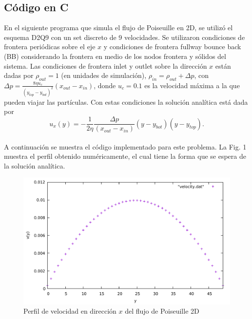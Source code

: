 \documentclass{article}
\begin{document}
\subsection{Código en C}
En el siguiente programa que simula el flujo de Poiseuille en 2D, se utilizó el esquema D2Q9 con un set discreto de 9 velocidades. Se utilizaron condiciones de frontera periódicas sobre el eje $x$ y condiciones de frontera fullway bounce back (BB) considerando la frontera en medio de los nodos frontera y sólidos del sistema. Las condiciones de frontera inlet y outlet sobre la dirección $x$ están dadas por $\rho_{out} = 1$ (en unidades de simulación), $\rho_{in}= \rho_{out} + \Delta p$, con $\Delta p=\frac{8\eta u_c}{(y_{top}-y_{bot})^2} (x_{out} - x_{in})$, donde $u_c=0.1$ es la velocidad máxima a la que pueden viajar las partículas. Con estas condiciones la solución analítica está dada por
\begin{equation}
     u_x(y)= -\frac{1}{2\eta} \frac{\Delta p}{(x_{out} - x_{in})} (y-y_{bot})(y-y_{top}).
\end{equation}\\

A continuación se muestra el código implementado para este problema. La Fig. 1 muestra el perfil obtenido numéricamente, el cual tiene la forma que se espera de la solución analítica.

\begin{figure}[h]
\centering
\includegraphics[scale=0.58]{Poiseuille.pdf}
\caption{Perfil de velocidad en dirección $x$ del flujo de Poiseuille 2D}
\end{figure}
\end{document}
